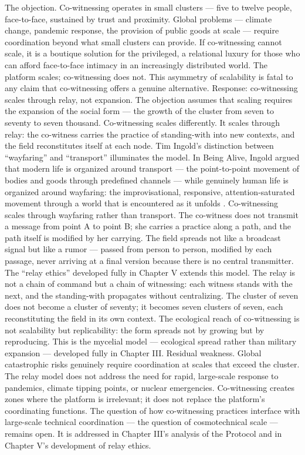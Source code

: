 The objection. Co-witnessing operates in small clusters --- five to twelve people, face-to-face, sustained by trust  and proximity. Global problems — climate change, pandemic response, the provision of public goods at scale — require coordination beyond what small clusters can provide. If co-witnessing cannot scale, it is a boutique solution for the privileged, a relational luxury for those who can afford face-to-face intimacy in an increasingly distributed world. The platform scales; co-witnessing does not. This asymmetry of scalability is fatal to any claim that co-witnessing offers a genuine alternative. Response: co-witnessing scales through relay, not expansion. The objection assumes that scaling requires the expansion of the social form — the growth of the cluster from seven to seventy to seven thousand. Co-witnessing scales differently. It scales through relay: the co-witness carries the practice of standing-with into new contexts, and the field reconstitutes itself at each node. Tim Ingold’s distinction between “wayfaring” and “transport” illuminates the model. In Being Alive, Ingold argued that modern life is organized around transport — the point-to-point movement of bodies and goods through predefined channels — while genuinely human life is organized around wayfaring: the improvisational, responsive, attention-saturated movement through a world that is encountered as it unfolds \cite[pp.~12--35]{ingold_2011}. Co-witnessing scales through wayfaring rather than transport. The co-witness does not transmit a message from point A to point B; she carries a practice along a path, and the path itself is modified by her carrying. The field spreads not like a broadcast signal but like a rumor — passed from person to person, modified by each passage, never arriving at a final version because there is no central transmitter. The “relay ethics” developed fully in Chapter V extends this model. The relay is not a chain of command but a chain of witnessing: each witness stands with the next, and the standing-with propagates without centralizing. The cluster of seven does not become a cluster of seventy; it becomes seven clusters of seven, each reconstituting the field in its own context. The ecological reach of co-witnessing is not scalability but replicability: the form spreads not by growing but by reproducing. This is the mycelial model — ecological spread rather than military expansion — developed fully in Chapter III. Residual weakness. Global catastrophic risks genuinely require coordination at scales that exceed the cluster. The relay model does not address the need for rapid, large-scale response to pandemics, climate tipping points, or nuclear emergencies. Co-witnessing creates zones where the platform is irrelevant; it does not replace the platform’s coordinating functions. The question of how co-witnessing practices interface with large-scale technical coordination — the question of cosmotechnical scale — remains open. It is addressed in Chapter III’s analysis of the  Protocol and in Chapter V’s development of relay ethics.

